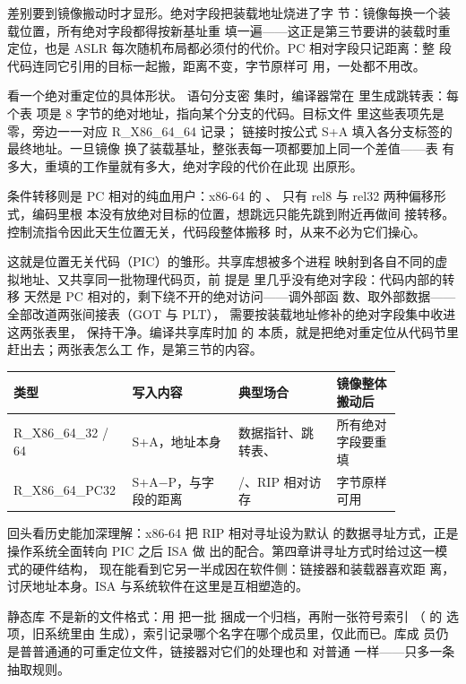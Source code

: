 差别要到镜像搬动时才显形。绝对字段把装载地址烧进了字
节：镜像每换一个装载位置，所有绝对字段都得按新基址重
填一遍——这正是第三节要讲的装载时重定位，也是 ASLR
每次随机布局都必须付的代价。PC 相对字段只记距离：整
段代码连同它引用的目标一起搬，距离不变，字节原样可
用，一处都不用改。

看一个绝对重定位的具体形状。 语句分支密
集时，编译器常在  里生成跳转表：每个表
项是 8 字节的绝对地址，指向某个分支的代码。目标文件
里这些表项先是零，旁边一一对应 R\_X86\_64\_64 记录；
链接时按公式 S+A 填入各分支标签的最终地址。一旦镜像
换了装载基址，整张表每一项都要加上同一个差值——表
有多大，重填的工作量就有多大，绝对字段的代价在此现
出原形。

条件转移则是 PC 相对的纯血用户：x86-64 的 、
 只有 rel8 与 rel32 两种偏移形式，编码里根
本没有放绝对目标的位置，想跳远只能先跳到附近再做间
接转移。控制流指令因此天生位置无关，代码段整体搬移
时，从来不必为它们操心。

这就是位置无关代码（PIC）的雏形。共享库想被多个进程
映射到各自不同的虚拟地址、又共享同一批物理代码页，前
提是  里几乎没有绝对字段：代码内部的转移
天然是 PC 相对的，剩下绕不开的绝对访问——调外部函
数、取外部数据——全部改道两张间接表（GOT 与 PLT），
需要按装载地址修补的绝对字段集中收进这两张表里，
 保持干净。编译共享库时加  的
本质，就是把绝对重定位从代码节里赶出去；两张表怎么工
作，是第三节的内容。

\begin{longtable}{L{0.2\linewidth}L{0.26\linewidth}L{0.24\linewidth}L{0.16\linewidth}}
\toprule
类型 & 写入内容 & 典型场合 & 镜像整体搬动后 \\
\midrule
R\_X86\_64\_32 / 64 & S+A，地址本身 & 数据指针、跳转表、 & 所有绝对字段要重填 \\
R\_X86\_64\_PC32 & S+A−P，与字段的距离 & /、RIP 相对访存 & 字节原样可用 \\
\bottomrule
\end{longtable}

回头看历史能加深理解：x86-64 把 RIP 相对寻址设为默认
的数据寻址方式，正是操作系统全面转向 PIC 之后 ISA 做
出的配合。第四章讲寻址方式时给过这一模式的硬件结构，
现在能看到它另一半成因在软件侧：链接器和装载器喜欢距
离，讨厌地址本身。ISA 与系统软件在这里是互相塑造的。

静态库  不是新的文件格式：用 
把一批  捆成一个归档，再附一张符号索引
（ 的  选项，旧系统里由 
生成），索引记录哪个名字在哪个成员里，仅此而已。库成
员仍是普普通通的可重定位文件，链接器对它们的处理也和
对普通  一样——只多一条抽取规则。

